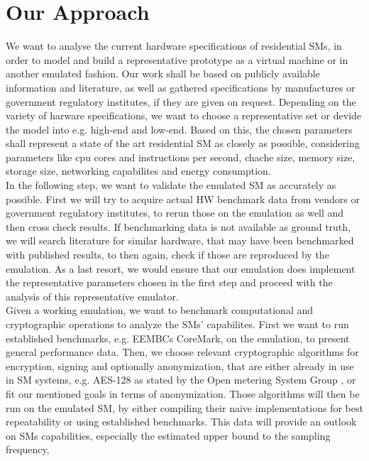 \documentclass[english]{tudscrartcl}
\begin{document}
	\section{Our Approach}
	\normalsize
	We want to analyse the current hardware specifications of residential SMs,
	in order to model and build a representative prototype as a virtual machine or in another emulated fashion.
	Our work shall be based on publicly available information and literature,
	as well as gathered specifications by manufactures or government regulatory institutes, if they are given on request.
	Depending on the variety of harware specifications, we want to choose a representative set or devide the model into e.g. high-end and low-end.
	Based on this, the chosen parameters shall represent a state of the art residential SM as closely as possible,
	considering parameters like cpu cores and instructions per second, chache size, memory size, storage size, networking capabilites and energy consumption. 
	\\ %
  	In the following step, we want to validate the emulated SM as accurately as possible.
	First we will try to acquire actual HW benchmark data from vendors or government regulatory institutes,
	to rerun those on the emulation as well and then cross check results.
	If benchmarking data is not available as ground truth, we will search literature for similar hardware,
	that may have been benchmarked with published results, to then again, check if those are reproduced by the emulation.
	As a last resort, we would ensure that our emulation does implement the representative parameters chosen in the first step and
	proceed with the analysis of this representative emulator.
	\\ %
	Given a working emulation, we want to benchmark computational and cryptographic operations to analyze the SMs' capabilites.
	First we want to run established benchmarks, e.g. EEMBCs CoreMark, on the emulation, to present general performance data.
	Then, we choose relevant cryptographic algorithms for encryption, signing and optionally anonymization,
	that are either already in use in SM systems, e.g. AES-128 as stated by the Open metering System Group \cite{OMS-Spec},
	or fit our mentioned goals in terms of anonymization. Those algorithms will then be run on the emulated SM,
	by either compiling their naive implementations for best repeatability or using established benchmarks.
	This data will provide an outlook on SMs capabilities, especially the estimated upper bound to the sampling frequency,
\end{document}
